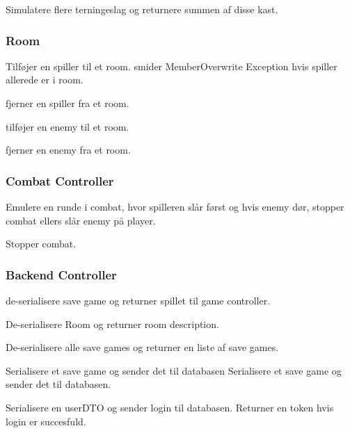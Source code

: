 {%
  Simulatere flere terningeslag og returnere summen af disse kast.
}

\subsubsection{Room}

{%
  Tilføjer en spiller til et room. smider MemberOverwrite Exception hvis spiller allerede er i room.
}

{%
  fjerner en spiller fra et room.
}

{%
  tilføjer en enemy til et room.
}

{%
  fjerner en enemy fra et room.
}

\subsubsection{Combat Controller}

{%
  Emulere en runde i combat, hvor spilleren slår først og hvis enemy dør, stopper combat ellers slår enemy på player.
}

{%
  Stopper combat.
}

\subsubsection{Backend Controller}

{%
  de-serialisere save game og returner spillet til game controller. 
}

{%
  De-serialisere Room og returner room description.
}

{%
  De-serialisere alle save games og returner en liste af save games.
}

{%
  Serialisere et save game og sender det til databasen
  Serialisere et save game og sender det til databasen.
}

{%
  Serialisere en userDTO og sender login til databasen. Returner en token hvis login er succesfuld.
}

